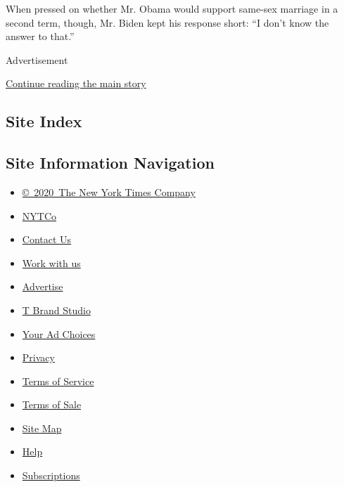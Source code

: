 When pressed on whether Mr. Obama would support same-sex marriage in a
second term, though, Mr. Biden kept his response short: ``I don't know
the answer to that.''

Advertisement

\protect\hyperlink{after-bottom}{Continue reading the main story}

\hypertarget{site-index}{%
\subsection{Site Index}\label{site-index}}

\hypertarget{site-information-navigation}{%
\subsection{Site Information
Navigation}\label{site-information-navigation}}

\begin{itemize}
\tightlist
\item
  \href{https://help.nytimes.com/hc/en-us/articles/115014792127-Copyright-notice}{©~2020~The
  New York Times Company}
\end{itemize}

\begin{itemize}
\tightlist
\item
  \href{https://www.nytco.com/}{NYTCo}
\item
  \href{https://help.nytimes.com/hc/en-us/articles/115015385887-Contact-Us}{Contact
  Us}
\item
  \href{https://www.nytco.com/careers/}{Work with us}
\item
  \href{https://nytmediakit.com/}{Advertise}
\item
  \href{http://www.tbrandstudio.com/}{T Brand Studio}
\item
  \href{https://www.nytimes.com/privacy/cookie-policy\#how-do-i-manage-trackers}{Your
  Ad Choices}
\item
  \href{https://www.nytimes.com/privacy}{Privacy}
\item
  \href{https://help.nytimes.com/hc/en-us/articles/115014893428-Terms-of-service}{Terms
  of Service}
\item
  \href{https://help.nytimes.com/hc/en-us/articles/115014893968-Terms-of-sale}{Terms
  of Sale}
\item
  \href{https://spiderbites.nytimes.com}{Site Map}
\item
  \href{https://help.nytimes.com/hc/en-us}{Help}
\item
  \href{https://www.nytimes.com/subscription?campaignId=37WXW}{Subscriptions}
\end{itemize}
